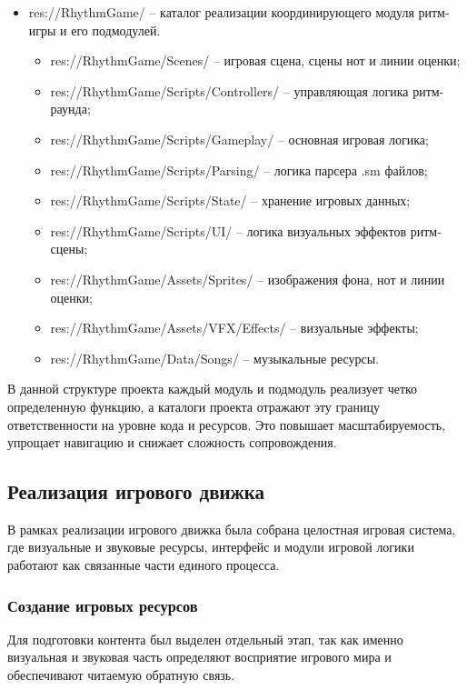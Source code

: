 \documentclass[utf8, russian]{eskdtext}
\numberwithin{equation}{section}
\begin{document}
\begin{itemize}
    \item res://RhythmGame/ -- каталог реализации координирующего модуля ритм-игры и его подмодулей.
    \begin{itemize}
        \item res://RhythmGame/Scenes/ -- игровая сцена, сцены нот и линии оценки;
        \item res://RhythmGame/Scripts/Controllers/ -- управляющая логика ритм-раунда;
        \item res://RhythmGame/Scripts/Gameplay/ -- основная игровая логика;
        \item res://RhythmGame/Scripts/Parsing/ -- логика парсера .sm файлов;
        \item res://RhythmGame/Scripts/State/ -- хранение игровых данных;
        \item res://RhythmGame/Scripts/UI/ -- логика визуальных эффектов ритм-сцены;
        \item res://RhythmGame/Assets/Sprites/ -- изображения фона, нот и линии оценки;
        \item res://RhythmGame/Assets/VFX/Effects/ -- визуальные эффекты;
        \item res://RhythmGame/Data/Songs/ -- музыкальные ресурсы.
    \end{itemize}
    
\end{itemize}

В данной структуре проекта каждый модуль и подмодуль реализует четко определенную функцию, а каталоги проекта отражают эту границу ответственности на уровне кода и ресурсов. Это повышает масштабируемость, упрощает навигацию и снижает сложность сопровождения.

\subsection{Реализация игрового движка}

В рамках реализации игрового движка была собрана целостная игровая система, где визуальные и звуковые ресурсы, интерфейс и модули игровой логики работают как связанные части единого процесса.

\subsubsection{Создание игровых ресурсов}

Для подготовки контента был выделен отдельный этап, так как именно визуальная и звуковая часть определяют восприятие игрового мира и обеспечивают читаемую обратную связь.
\end{document}
